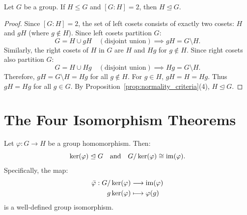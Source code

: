 \begin{proposition}
\label{prop:index2_normal}
Let $G$ be a group. If $H \le G$ and $[G : H] = 2$, then $H \trianglelefteq G$.
\end{proposition}

\begin{proof}
Since $[G : H] = 2$, the set of left cosets consists of exactly two cosets: $H$ and $gH$ (where $g \notin H$).
Since left cosets partition $G$:
\begin{equation*}
G = H \cup gH \quad (\text{disjoint union}) \implies gH = G \setminus H.
\end{equation*}
Similarly, the right cosets of $H$ in $G$ are $H$ and $Hg$ for $g \notin H$.
Since right cosets also partition $G$:
\begin{equation*}
G = H \cup Hg \quad (\text{disjoint union}) \implies Hg = G \setminus H.
\end{equation*}
Therefore, $gH = G \setminus H = Hg$ for all $g \notin H$.
For $g \in H$, $gH = H = Hg$.
Thus $gH = Hg$ for all $g \in G$. By Proposition~\ref{prop:normality_criteria}(4), $H \trianglelefteq G$.
\end{proof}

\section{The Four Isomorphism Theorems}
\label{sec:isomorphism_theorems}

\begin{theorem}
\label{thm:first_iso}
Let $\varphi: G \to H$ be a group homomorphism. Then:
\begin{equation}
\ker(\varphi) \trianglelefteq G \quad \text{and} \quad G/\ker(\varphi) \cong \operatorname{im}(\varphi).
\end{equation}
Specifically, the map:
\begin{align}
\bar{\varphi}: G/\ker(\varphi) &\longrightarrow \operatorname{im}(\varphi) \\
g \ker(\varphi) &\longmapsto \varphi(g)
\end{align}
is a well-defined group isomorphism.
\end{theorem}

